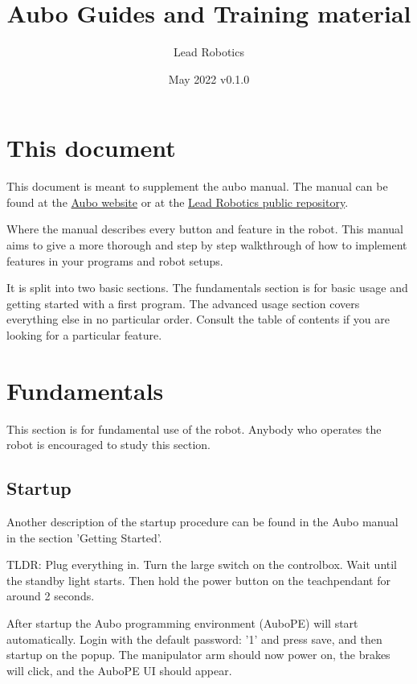 \documentclass{article}
\title{Aubo Guides and Training material}
\author{Lead Robotics}
\date{May 2022 v0.1.0}
\begin{document}
\maketitle

\tableofcontents

\section{This document} 
This document is meant to supplement the aubo manual. The manual can be found at the \href{https://github.com/MalteNJLead/LeadPublic/tree/main/Aubo}{Aubo website} or at the \href{https://github.com/MalteNJLead/LeadPublic/tree/main/Aubo}{Lead Robotics public repository}.

Where the manual describes every button and feature in the robot. This manual aims to give a more thorough and step by step walkthrough of how to implement features in your programs and robot setups.
  
It is split into two basic sections. The fundamentals section is for basic usage and getting started with a first program. The advanced usage section covers everything else in no particular order. Consult the table of contents if you are looking for a particular feature. 

\section{Fundamentals}
This  section is for fundamental use of the robot. Anybody who operates the robot is encouraged to study this section. 

\subsection{Startup}
\label{subsec:Startup}
Another description of the startup procedure can be found in the Aubo manual in the section 'Getting Started'.

TLDR: Plug everything in. Turn the large switch on the controlbox. Wait until the standby light starts. Then hold the power button on the teachpendant for around 2 seconds. 

After startup the Aubo programming environment (AuboPE) will start automatically. Login with the default password: '1' and press save, and then startup on the popup. The manipulator arm should now power on, the brakes will click, and the AuboPE UI should appear.  
\end{document}
